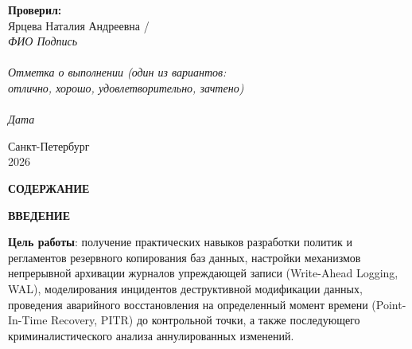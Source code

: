\documentclass[a4paper,14pt]{article}
\begin{document}
\begin{titlepage}
\begin{flushright}
        \textbf{Проверил:}\\ [0.5em]
        Ярцева Наталия Андреевна / \underline{\hspace{1.5cm}} \\
        {\scriptsize{\textit{ФИО \hspace{2cm} Подпись \hspace{1cm}}}} \\ [1.5cm]

        {\scriptsize \underline{\hspace{4cm}}} \\
        {\scriptsize \textit{Отметка о выполнении (один из вариантов: \\ отлично, хорошо, удовлетворительно, зачтено)}} \\
        {\scriptsize \underline{\hspace{4cm}}} \\
        {\scriptsize \textit{Дата \hspace{1.5cm}}}
    \end{flushright}

    \vfill
    Санкт-Петербург\\
    2026
\end{titlepage}

\newpage
\pagestyle{plain}
\setcounter{page}{2}

\begin{center}
    {\bfseries \MakeUppercase{Содержание}}
\end{center}
\vspace{-0.5cm}
\tableofcontents

\newpage
\begin{center}
    {\bfseries \MakeUppercase{Введение}}
\end{center}

\textbf{Цель работы}: получение практических навыков разработки политик и регламентов резервного копирования баз данных, настройки механизмов непрерывной архивации журналов упреждающей записи (Write-Ahead Logging, WAL), моделирования инцидентов деструктивной модификации данных, проведения аварийного восстановления на определенный момент времени (Point-In-Time Recovery, PITR) до контрольной точки, а также последующего криминалистического анализа аннулированных изменений.
\end{document}
